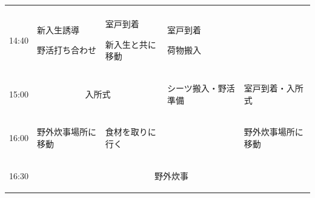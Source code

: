 \begin{longtable}[c]{|p{}|p{}|p{}|p{}|p{}|}
\begin{tpecol}
  \end{tpecol}\\
  \hdashline

  \begin{tpacol}
    14:40
  \end{tpacol}&
  \begin{tpbcol}
    新入生誘導\par
    野活打ち合わせ
  \end{tpbcol}&
  \begin{tpccol}
    室戸到着 \par
    新入生と共に移動
  \end{tpccol}&
  \begin{tpdcol}
    室戸到着 \par
    荷物搬入
  \end{tpdcol}&
  \begin{tpecol}
    
  \end{tpecol}\\
  \hdashline

  \begin{tpacol}
    15:00
  \end{tpacol}&
  \multicolumn{2}{c|}{入所式} &
  \begin{tpdcol}
    シーツ搬入・野活準備
  \end{tpdcol}&
  \begin{tpecol}
    室戸到着・入所式
  \end{tpecol}\\
  \hdashline

  \begin{tpacol}
    16:00
  \end{tpacol}&
  \begin{tpbcol}
    野外炊事場所に移動
  \end{tpbcol}&
  \begin{tpccol}
    食材を取りに行く
  \end{tpccol}&
  \begin{tpdcol}
    
  \end{tpdcol}&
  \begin{tpecol}
    野外炊事場所に移動
  \end{tpecol}\\
  \hdashline

  \begin{tpacol}
    16:30
  \end{tpacol}&
  \multicolumn{4}{c|}{野外炊事} \\


\end{longtable}
